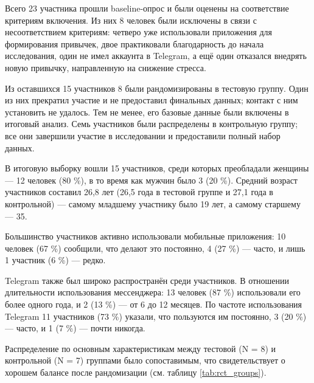 \documentclass[pdflatex,sn-mathphys-num]{sn-jnl}%
\theoremstyle{thmstyleone}%
\theoremstyle{thmstyletwo}%
\theoremstyle{thmstylethree}%
\begin{document}
Всего 23 участника прошли baseline-опрос и были оценены на соответствие критериям включения. Из них 8 человек были исключены в связи с несоответствием критериям: четверо уже использовали приложения для формирования привычек, двое практиковали благодарность до начала исследования, один не имел аккаунта в Telegram, а ещё один отказался внедрять новую привычку, направленную на снижение стресса.

Из оставшихся 15 участников 8 были рандомизированы в тестовую группу. Один из них прекратил участие и не предоставил финальных данных; контакт с ним установить не удалось. Тем не менее, его базовые данные были включены в итоговый анализ. Семь участников были распределены в контрольную группу; все они завершили участие в исследовании и предоставили полный набор данных.

В итоговую выборку вошли 15 участников, среди которых преобладали женщины — 12 человек (80 \%), в то время как мужчин было 3 (20 \%). Средний возраст участников составил 26,8 лет (26,5 года в тестовой группе и 27,1 года в контрольной) — самому младшему участнику было 19 лет, а самому старшему — 35.

Большинство участников активно использовали мобильные приложения: 10 человек (67 \%) сообщили, что делают это постоянно, 4 (27 \%) — часто, и лишь 1 участник (6 \%) — редко.

Telegram также был широко распространён среди участников. В отношении длительности использования мессенджера: 13 человек (87 \%) использовали его более одного года, и 2 (13 \%) — от 6 до 12 месяцев. По частоте использования Telegram 11 участников (73 \%) указали, что пользуются им постоянно, 3 (20 \%) — часто, и 1 (7 \%) — почти никогда.

Распределение по основным характеристикам между тестовой (N = 8) и контрольной (N = 7) группами было сопоставимым, что свидетельствует о хорошем балансе после рандомизации (см. таблицу \ref{tab:rct_groups}).
\end{document}
